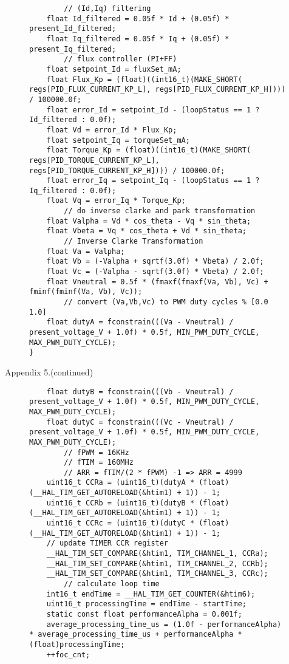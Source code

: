 \begin{figure}[H]
	\centering
	\begin{verbatim}
		// (Id,Iq) filtering
	float Id_filtered = 0.05f * Id + (0.05f) * present_Id_filtered;
    float Iq_filtered = 0.05f * Iq + (0.05f) * present_Iq_filtered;
    	// flux controller (PI+FF)
    float setpoint_Id = fluxSet_mA;
    float Flux_Kp = (float)((int16_t)(MAKE_SHORT( regs[PID_FLUX_CURRENT_KP_L], regs[PID_FLUX_CURRENT_KP_H]))) / 100000.0f;
    float error_Id = setpoint_Id - (loopStatus == 1 ? Id_filtered : 0.0f);
    float Vd = error_Id * Flux_Kp;
    float setpoint_Iq = torqueSet_mA;
    float Torque_Kp = (float)((int16_t)(MAKE_SHORT( regs[PID_TORQUE_CURRENT_KP_L], regs[PID_TORQUE_CURRENT_KP_H]))) / 100000.0f;
    float error_Iq = setpoint_Iq - (loopStatus == 1 ? Iq_filtered : 0.0f);
    float Vq = error_Iq * Torque_Kp;
		// do inverse clarke and park transformation
    float Valpha = Vd * cos_theta - Vq * sin_theta;
    float Vbeta = Vq * cos_theta + Vd * sin_theta;
        // Inverse Clarke Transformation
    float Va = Valpha;
    float Vb = (-Valpha + sqrtf(3.0f) * Vbeta) / 2.0f;
    float Vc = (-Valpha - sqrtf(3.0f) * Vbeta) / 2.0f;
    float Vneutral = 0.5f * (fmaxf(fmaxf(Va, Vb), Vc) + fminf(fminf(Va, Vb), Vc));
    	// convert (Va,Vb,Vc) to PWM duty cycles % [0.0 1.0]
	float dutyA = fconstrain(((Va - Vneutral) / present_voltage_V + 1.0f) * 0.5f, MIN_PWM_DUTY_CYCLE, MAX_PWM_DUTY_CYCLE);
}	\end{verbatim}
\end{figure}
\newpage
\hfill \large Appendix 5.(continued)

\begin{figure}[H]
	\centering
	\begin{verbatim}
    float dutyB = fconstrain(((Vb - Vneutral) / present_voltage_V + 1.0f) * 0.5f, MIN_PWM_DUTY_CYCLE, MAX_PWM_DUTY_CYCLE);
    float dutyC = fconstrain(((Vc - Vneutral) / present_voltage_V + 1.0f) * 0.5f, MIN_PWM_DUTY_CYCLE, MAX_PWM_DUTY_CYCLE);
        // fPWM = 16KHz
        // fTIM = 160MHz
        // ARR = fTIM/(2 * fPWM) -1 => ARR = 4999
    uint16_t CCRa = (uint16_t)(dutyA * (float)(__HAL_TIM_GET_AUTORELOAD(&htim1) + 1)) - 1;
    uint16_t CCRb = (uint16_t)(dutyB * (float)(__HAL_TIM_GET_AUTORELOAD(&htim1) + 1)) - 1;
    uint16_t CCRc = (uint16_t)(dutyC * (float)(__HAL_TIM_GET_AUTORELOAD(&htim1) + 1)) - 1;
    // update TIMER CCR register
    __HAL_TIM_SET_COMPARE(&htim1, TIM_CHANNEL_1, CCRa);
    __HAL_TIM_SET_COMPARE(&htim1, TIM_CHANNEL_2, CCRb);
    __HAL_TIM_SET_COMPARE(&htim1, TIM_CHANNEL_3, CCRc);
		// calculate loop time
    int16_t endTime = __HAL_TIM_GET_COUNTER(&htim6);
    uint16_t processingTime = endTime - startTime;
    static const float performanceAlpha = 0.001f;
    average_processing_time_us = (1.0f - performanceAlpha) * average_processing_time_us + performanceAlpha * (float)processingTime;
    ++foc_cnt;
	\end{verbatim}
\end{figure}

